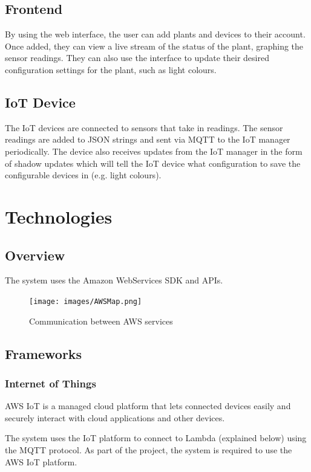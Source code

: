\documentclass{article}
\begin{document}
	\subsection{Frontend}
	
		By using the web interface, the user can add plants and devices to their account. Once added, they can view a live stream of the status of the plant, graphing the sensor readings. They can also use the interface to update their desired configuration settings for the plant, such as light colours. 
	
	\subsection{IoT Device}
		
		The IoT devices are connected to sensors that take in readings. The sensor readings are added to JSON strings and sent via MQTT to the IoT manager periodically. The device also receives updates from the IoT manager in the form of shadow updates which will tell the IoT device what configuration to save the configurable devices in (e.g. light colours).

	
	
\section{Technologies}
	\subsection{Overview}
	The system uses the Amazon WebServices SDK and APIs.
	\begin{figure}[H]
		\centering
		\texttt{[image: images/AWSMap.png]}
		\caption{Communication between AWS services}
	\end{figure}
	
	\subsection{Frameworks}
	\subsubsection{Internet of Things}
	AWS IoT is a managed cloud platform that lets connected devices easily and securely interact with cloud applications and other devices.

	The system uses the IoT platform to connect to Lambda (explained below) using the MQTT protocol. As part of the project, the system is required to use the AWS IoT platform.
\end{document}
